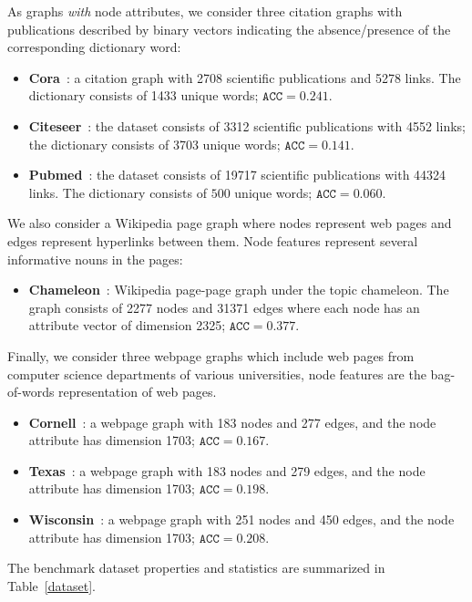 \documentclass[11pt]{article}
\begin{document}
As graphs \textit{with} node attributes, we consider three citation graphs with publications described by binary vectors indicating the absence/presence of the corresponding dictionary word: 
\begin{itemize}
    \item \textbf{Cora}~\citep{mccallum2000automating}: a citation graph with 2708 scientific publications and 5278 links. The dictionary consists of 1433 unique words; $\mathtt{ACC} = 0.241$.
    \item \textbf{Citeseer}~\citep{giles1998citeseer}: the dataset consists of 3312 scientific publications with 4552 links; the dictionary consists of 3703 unique words; $\mathtt{ACC} = 0.141$.
    \item \textbf{Pubmed}~\citep{namata2012query}: the dataset consists of 19717 scientific publications with 44324 links. The dictionary consists of $500$ unique words; $\mathtt{ACC} = 0.060$.
\end{itemize}
We also consider a Wikipedia page graph where nodes represent web pages and edges represent hyperlinks between them. Node features represent several informative nouns in the pages:
\begin{itemize}
    \item \textbf{Chameleon}~\citep{rozemberczki2021multi}: Wikipedia page-page graph under the topic chameleon. The graph consists of 2277 nodes and 31371 edges where each node has an attribute vector of dimension 2325; $\mathtt{ACC} = 0.377$.
\end{itemize}
Finally, we consider three webpage graphs which include web pages from computer science departments of various universities, node features are the bag-of-words representation of web pages. 
\begin{itemize}
    \item \textbf{Cornell}~\citep{craven1998learning}: a webpage graph with 183 nodes and 277 edges, and the node attribute has dimension 1703; $\mathtt{ACC} = 0.167$.
    \item \textbf{Texas}~\citep{craven1998learning}: a webpage graph with 183 nodes and 279 edges, and the node attribute has dimension 1703; $\mathtt{ACC} = 0.198$.
    \item \textbf{Wisconsin}~\citep{craven1998learning}: a webpage graph with 251 nodes and 450 edges, and the node attribute has dimension 1703; $\mathtt{ACC} = 0.208$.
\end{itemize}

The benchmark dataset properties and statistics are summarized in Table~\ref{dataset}.
\end{document}
